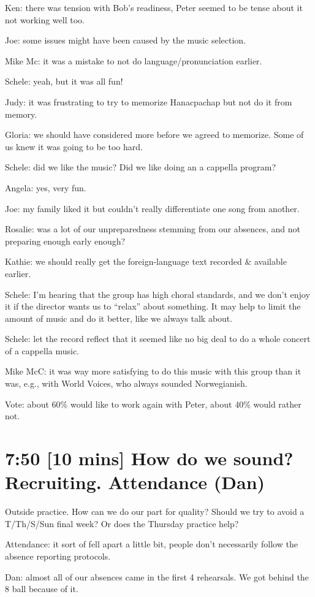 \documentclass[11pt]{article}
\begin{document}
Ken: there was tension with Bob's readiness, Peter seemed to be tense
about it not working well too.

Joe: some issues might have been caused by the music selection.

Mike Mc: it was a mistake to not do language/pronunciation earlier.

Schele: yeah, but it was all fun!

Judy: it was frustrating to try to memorize Hanacpachap but not do it
from memory.

Gloria: we should have considered more before we agreed to memorize.
Some of us knew it was going to be too hard.

Schele: did we like the music?  Did we like doing an a cappella
program?

Angela: yes, very fun.

Joe: my family liked it but couldn't really differentiate one song
from another.

Rosalie: was a lot of our unpreparedness stemming from our absences,
and not preparing enough early enough?

Kathie: we should really get the foreign-language text recorded \&
available earlier.

Schele: I'm hearing that the group has high choral standards, and we
don't enjoy it if the director wants us to ``relax'' about something.
It may help to limit the amount of music and do it better, like we
always talk about.

Schele: let the record reflect that it seemed like no big deal to do a
whole concert of a cappella music.

Mike McC: it was way more satisfying to do this music with this group
than it was, e.g., with World Voices, who always sounded Norwegianish.

Vote: about 60\% would like to work again with Peter, about 40\% would
rather not.
\section{7:50 [10 mins] How do we sound?  Recruiting.  Attendance (Dan)}
\label{sec-4}

   Outside practice. How can we do our part for quality?  Should we
   try to avoid a T/Th/S/Sun final week?  Or does the Thursday
   practice help?

Attendance: it sort of fell apart a little bit, people don't
necessarily follow the absence reporting protocols.

Dan: almost all of our absences came in the first 4 rehearsals.  We
got behind the 8 ball because of it.
\end{document}
